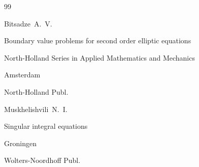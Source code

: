 \begin{thebibliography}{99}

\by Bitsadze~A.~V.

\book Boundary value problems for second order elliptic equations


\serial North-Holland Series in Applied Mathematics and Mechanics


\publaddr Amsterdam

\publ North-Holland Publ. 








\by Muskhelishvili~N.~I.

\book Singular integral equations

\publaddr Groningen

\publ Wolters-Noordhoff Publ.












\end{thebibliography}



\EngDate



\Russian

\renewcommand{\baselinestretch}{0.9}



\newpage



%

%

